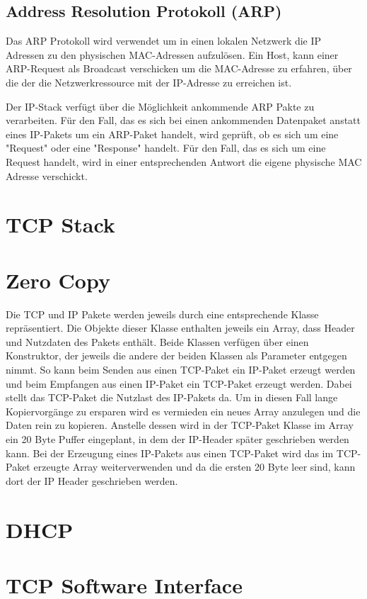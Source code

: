 \subsection{Address Resolution Protokoll (ARP)}
Das ARP Protokoll wird verwendet um in einen lokalen Netzwerk die IP Adressen zu den physischen MAC-Adressen aufzulösen. Ein Host, kann einer ARP-Request als Broadcast verschicken um die MAC-Adresse zu erfahren, über die der die Netzwerkressource mit der IP-Adresse zu erreichen ist. 

Der IP-Stack verfügt über die Möglichkeit ankommende ARP Pakte zu verarbeiten. Für den Fall, das es sich bei einen ankommenden Datenpaket anstatt eines IP-Pakets um ein ARP-Paket handelt, wird geprüft, ob es sich um eine {}"Request"{} oder eine {}"Response"{} handelt. Für den Fall, das es sich um eine Request handelt, wird in einer entsprechenden Antwort die eigene physische MAC Adresse verschickt. 







\section{TCP Stack}

\section{Zero Copy}
Die TCP und IP Pakete werden jeweils durch eine entsprechende Klasse repräsentiert. Die Objekte dieser Klasse enthalten jeweils ein Array, dass Header und Nutzdaten des Pakets enthält. Beide Klassen verfügen über einen Konstruktor, der jeweils die andere der beiden Klassen als Parameter entgegen nimmt. So kann beim Senden aus einen TCP-Paket ein IP-Paket erzeugt werden und beim Empfangen aus einen IP-Paket ein TCP-Paket erzeugt werden. Dabei stellt das TCP-Paket die Nutzlast des IP-Pakets da. Um in diesen Fall lange Kopiervorgänge zu ersparen wird es vermieden ein neues Array anzulegen und die Daten rein zu kopieren. Anstelle dessen wird in der TCP-Paket Klasse im Array ein 20 Byte Puffer eingeplant, in dem der IP-Header später geschrieben werden kann. Bei der Erzeugung eines IP-Pakets aus einen TCP-Paket wird das im TCP-Paket erzeugte Array weiterverwenden und da die ersten 20 Byte leer sind, kann dort der IP Header geschrieben werden. 


\section{DHCP}

\section{TCP Software Interface}

